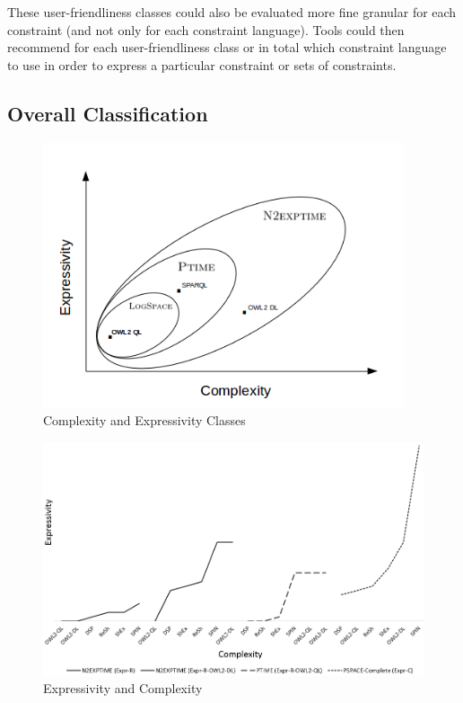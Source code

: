 \documentclass{llncs}
\begin{document}
These user-friendliness classes could also be evaluated more fine granular for each constraint (and not only for each constraint language).
Tools could then recommend for each user-friendliness class or in total which constraint language to use in order to express a particular constraint or sets of constraints. 

\subsection{Overall Classification}
 
\begin{figure}
	\centering
		\includegraphics[width=0.95\textwidth]{complexiity_and_expressivity.png}
	\caption{Complexity and Expressivity Classes}
	\label{fig:VennDiagram}
\end{figure}
  
\begin{figure}
	\centering
		\includegraphics[width=1.00\textwidth]{expressivity-complexity-3.png}
	\caption{Expressivity and Complexity}
	\label{fig:expressivity-complexity}
\end{figure}
\end{document}
